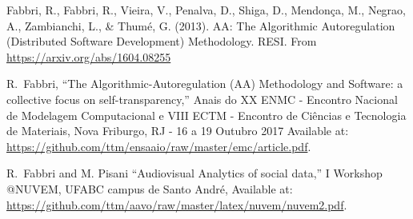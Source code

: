 \documentclass[letterpaper,10pt]{article}
\begin{document}
\begin{thebibliography}{99}
	Fabbri, R., Fabbri, R., Vieira, V., Penalva, D., Shiga, D., Mendonça, M., Negrao, A., Zambianchi, L., \& Thumé, G. (2013). AA: The Algorithmic Autoregulation (Distributed Software Development) Methodology. RESI. From \url{https://arxiv.org/abs/1604.08255}

  R.~Fabbri,
  ``The Algorithmic-Autoregulation (AA) Methodology and Software: a collective focus on self-transparency,''
  Anais do XX ENMC - Encontro Nacional de Modelagem Computacional e
  VIII ECTM - Encontro de Ci\^encias e Tecnologia de Materiais, Nova Friburgo,
  RJ - 16 a 19 Outubro 2017
		Available at: \url{https://github.com/ttm/ensaaio/raw/master/emc/article.pdf}.

  R.~Fabbri and M. Pisani
  ``Audiovisual Analytics of social data,''
  I Workshop @NUVEM, UFABC campus de Santo André,
		Available at: \url{https://github.com/ttm/aavo/raw/master/latex/nuvem/nuvem2.pdf}.
\end{thebibliography}
\end{document}
